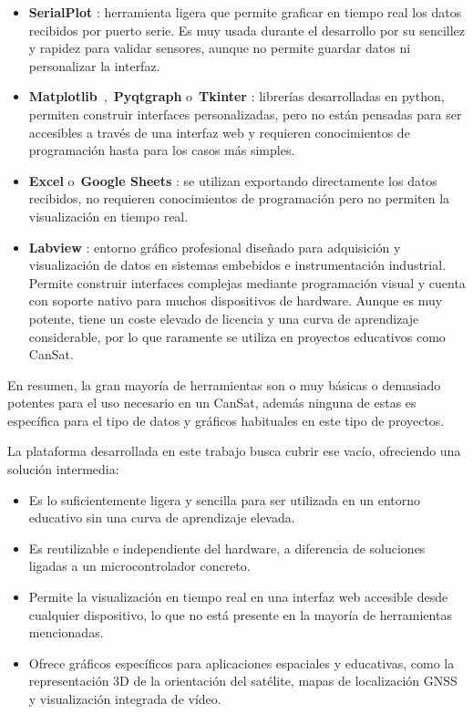 \begin{itemize}
    \item \textbf{SerialPlot} \cite{serialplot}: herramienta ligera que permite graficar en tiempo real los datos recibidos por puerto serie.
    Es muy usada durante el desarrollo por su sencillez y rapidez para validar sensores, aunque no permite guardar datos ni personalizar la interfaz.
    \item \textbf{Matplotlib}~\cite{matplotlib},~\textbf{Pyqtgraph} \cite{pyqtgraph} o~\textbf{Tkinter} \cite{tkinter}: librerías desarrolladas en python, permiten construir interfaces personalizadas, pero no están pensadas para ser accesibles a través de una interfaz web y requieren conocimientos de programación hasta para los casos más simples.
    \item \textbf{Excel} \cite{excel} o~\textbf{Google Sheets} \cite{googlesheets}: se utilizan exportando directamente los datos recibidos, no requieren conocimientos de programación pero no permiten la visualización en tiempo real.
    \item \textbf{Labview} \cite{labview}: entorno gráfico profesional diseñado para adquisición y visualización de datos en sistemas embebidos e instrumentación industrial.
    Permite construir interfaces complejas mediante programación visual y cuenta con soporte nativo para muchos dispositivos de hardware.
    Aunque es muy potente, tiene un coste elevado de licencia y una curva de aprendizaje considerable, por lo que raramente se utiliza en proyectos educativos como CanSat.
\end{itemize}

En resumen, la gran mayoría de herramientas son o muy básicas o demasiado potentes para el uso necesario en un CanSat, además ninguna de estas es específica para el tipo de datos y gráficos habituales en este tipo de proyectos.

La plataforma desarrollada en este trabajo busca cubrir ese vacío, ofreciendo una solución intermedia: 
\begin{itemize}
    \item Es lo suficientemente ligera y sencilla para ser utilizada en un entorno educativo sin una curva de aprendizaje elevada.
    \item Es reutilizable e independiente del hardware, a diferencia de soluciones ligadas a un microcontrolador concreto.
    \item Permite la visualización en tiempo real en una interfaz web accesible desde cualquier dispositivo, lo que no está presente en la mayoría de herramientas mencionadas.
    \item Ofrece gráficos específicos para aplicaciones espaciales y educativas, como la representación 3D de la orientación del satélite, mapas de localización GNSS y visualización integrada de vídeo.
\end{itemize}

